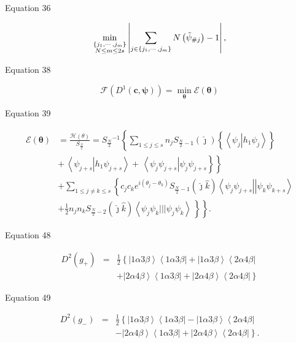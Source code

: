 \documentclass{article}
\begin{document}
Equation 36

\[
\min_{\substack{ \left\{ j_{1},\cdots ,j_{m}\right\}  \\ N\leq m\leq 2s}}%
\left\vert \sum_{j\in \left\{ j_{1},\cdots ,j_{m}\right\} }N\left( \tilde{%
\psi}_{\#j}\right) -1\right\vert ,
\]

Equation 38

\[
\mathcal{F}\left( D^{1}\left( \boldsymbol{c},\boldsymbol{\psi }\right)
\right) =\min_{\boldsymbol{\theta }}\mathcal{E}\left( \boldsymbol{\theta }%
\right) 
\]

Equation 39

\begin{align*}
\mathcal{E}\left( \boldsymbol{\theta }\right) & =\frac{\mathcal{H}\left(
\theta \right) }{S_{\frac{N}{2}}}=S_{\frac{N}{2}}{}^{-1}\left\{ \sum_{1\leq
j\leq s}n_{j}S_{\frac{N}{2}-1}\left( \hat{\jmath}\right) \left\{
\left\langle \psi _{j}\left\vert h_{1}\psi _{j}\right. \right\rangle
\right\} \right.  \\
& \left. \left. +\,\left\langle \psi _{j+s}\left\vert h_{1}\psi
_{j+s}\right. \right\rangle +\,\left\langle \psi _{j}\psi _{j+s}\right\vert
\psi _{j}\psi _{j+s}\right\} \right\}  \\
& +\sum_{1\leq j\neq k\leq s}\left\{ c_{j}c_{k}e^{i\left( \theta _{j}-\theta
_{k}\right) }S_{\frac{N}{2}-1}\left( \hat{\jmath}\hat{k}\right) \left\langle
\psi _{j}\psi _{j+s}\right\vert \left\vert \psi _{k}\psi _{k+s}\right\rangle
\right.  \\
& \left. \left. +\frac{1}{2}n_{j}n_{k}S_{\frac{N}{2}-2}\left( \hat{\jmath}%
\hat{k}\right) \left\langle \psi _{j}\psi _{k}|||\psi _{j}\psi
_{k}\right\rangle \,\right\} \right\} .
\end{align*}

Equation 48

\begin{eqnarray*}
D^{2}\left( g_{+}\right)  &=&\frac{1}{2}\left\{ \left\vert 1\alpha 3\beta
\right\rangle \left\langle 1\alpha 3\beta \right\vert +\left\vert 1\alpha
3\beta \right\rangle \left\langle 2\alpha 4\beta \right\vert \right.  \\
&&+\left. \left\vert 2\alpha 4\beta \right\rangle \left\langle 1\alpha
3\beta \right\vert +\left\vert 2\alpha 4\beta \right\rangle \left\langle
2\alpha 4\beta \right\vert \right\} 
\end{eqnarray*}

Equation 49

\begin{eqnarray*}
D^{2}\left( g_{-}\right)  &=&\frac{1}{2}\left\{ \left\vert 1\alpha 3\beta
\right\rangle \left\langle 1\alpha 3\beta \right\vert -\left\vert 1\alpha
3\beta \right\rangle \left\langle 2\alpha 4\beta \right\vert \right.  \\
&&-\left. \left\vert 2\alpha 4\beta \right\rangle \left\langle 1\alpha
3\beta \right\vert +\left\vert 2\alpha 4\beta \right\rangle \left\langle
2\alpha 4\beta \right\vert \right\} .
\end{eqnarray*}
\end{document}
